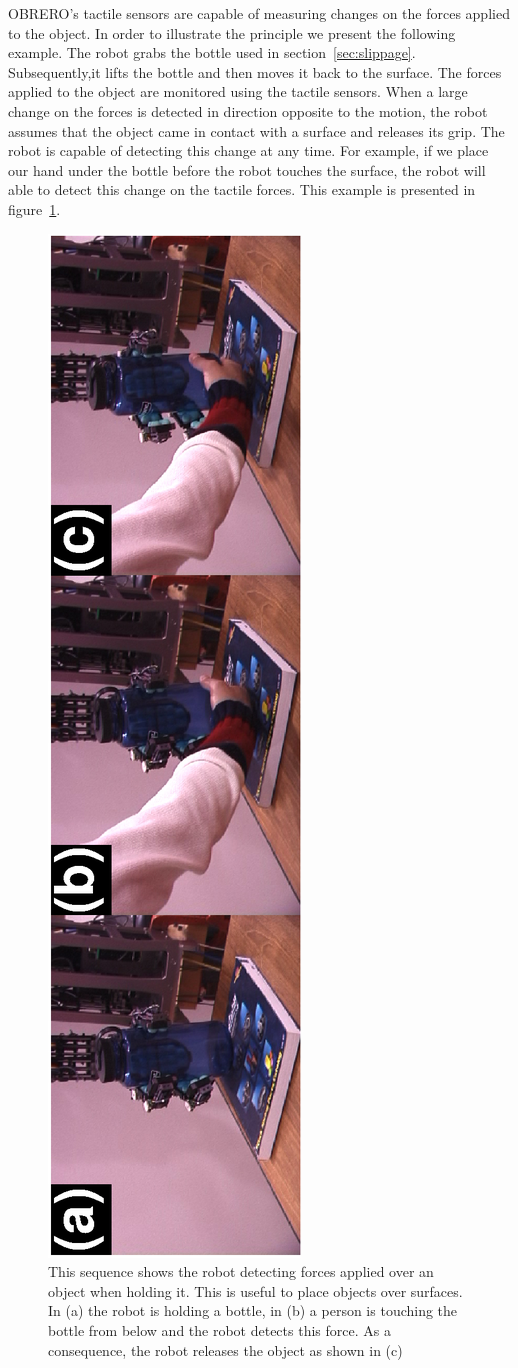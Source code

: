 OBRERO's tactile sensors are capable of measuring changes on the
forces applied to the object. In order to illustrate the principle
we present the following example. The robot grabs the bottle used
in section~\ref{sec:slippage}. Subsequently,it lifts the bottle
and then moves it back to the surface. The forces applied to the
object are monitored using the tactile sensors. When a large
change on the forces is detected in direction opposite to the
motion, the robot assumes that the object came in contact with a
surface and releases its grip. The robot is capable of detecting
this change at any time. For example, if we place our hand under
the bottle before the robot touches the surface, the robot will
able to detect this change on the tactile forces. This example is
presented in figure~\ref{fig:landing}.


\begin{figure}[tbp]
\centerline{
\includegraphics[height=\columnwidth, angle=270 ]{./figures/SeqHandDelivery.eps}
} \caption[Detection of forces applied to an object held by the
robot]{This sequence shows the robot detecting forces applied over
an object when holding it. This is useful to place objects over
surfaces. In (a) the robot is holding a bottle, in (b) a person is
touching the bottle from below and the robot detects this force.
As a consequence, the robot releases the object as shown in (c)}
\label{fig:landing}
\end{figure}


